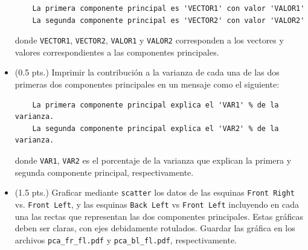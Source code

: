 \documentclass[11pt,letterpaper]{exam}
\begin{document}
\begin{questions}
\begin{itemize}
\begin{verbatim}
	La primera componente principal es 'VECTOR1' con valor 'VALOR1'
	La segunda componente principal es 'VECTOR2' con valor 'VALOR2'
\end{verbatim}

donde \verb'VECTOR1', \verb'VECTOR2', \verb'VALOR1' y \verb'VALOR2' corresponden a los vectores y valores correspondientes a las componentes principales.

\item (0.5 pts.) Imprimir la contribuci\'on a la varianza de cada una de las dos primeras dos componentes principales en un mensaje como el siguiente:

\begin{verbatim}
	La primera componente principal explica el 'VAR1' % de la varianza.
	La segunda componente principal explica el 'VAR2' % de la varianza.
\end{verbatim}

donde \verb'VAR1', \verb'VAR2' es el porcentaje de la varianza que explican la primera y segunda componente principal, respectivamente.

\item (1.5 pts.) Graficar mediante \verb'scatter' los datos de las esquinas \verb'Front Right' vs. \verb'Front Left', y las esquinas \verb'Back Left' vs \verb'Front Left' incluyendo en cada una las rectas que representan las dos componentes principales. Estas gr\'aficas deben ser claras, con ejes debidamente rotulados. Guardar las gr\'afica en los archivos \verb'pca_fr_fl.pdf' y \verb'pca_bl_fl.pdf', respectivamente.
\end{itemize}

\end{questions}
\end{document}
